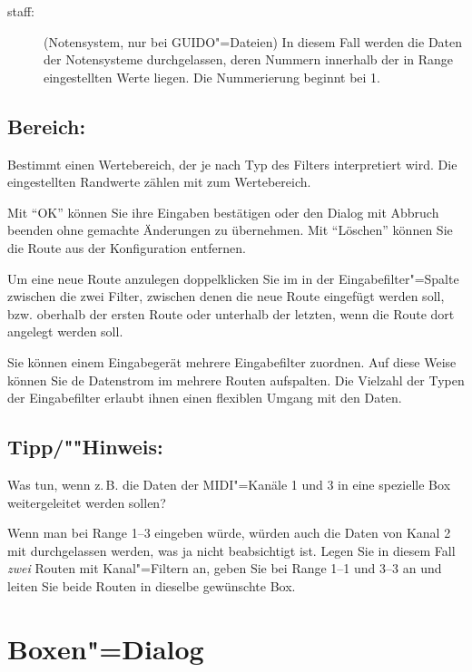 {\begin{description}
\item[staff:] (Notensystem, nur bei GUIDO"=Dateien) In diesem Fall
  werden die Daten der Notensysteme durchgelassen, deren Nummern
  innerhalb der in Range eingestellten Werte liegen. Die Nummerierung
  beginnt bei 1.
\end{description}


\subsection{Bereich:}

Bestimmt einen Wertebereich, der je nach Typ des Filters interpretiert
wird. Die eingestellten Randwerte zählen mit zum Wertebereich.

Mit "`OK"' können Sie ihre Eingaben bestätigen oder den Dialog mit Abbruch
beenden ohne gemachte Änderungen zu übernehmen.  Mit "`Löschen"'
können Sie die Route aus der Konfiguration entfernen.


Um eine neue Route anzulegen doppelklicken Sie im
 in der Eingabefilter"=Spalte
zwischen die zwei Filter, zwischen denen die neue Route eingefügt
werden soll, bzw. oberhalb der ersten Route oder unterhalb der
letzten, wenn die Route dort angelegt werden soll.

Sie können einem Eingabegerät mehrere Eingabefilter zuordnen. 
Auf diese Weise können Sie de Datenstrom im mehrere Routen 
aufspalten. Die Vielzahl der Typen der Eingabefilter erlaubt 
ihnen einen flexiblen Umgang mit den Daten.

\subsection{Tipp/""Hinweis:}
Was tun, wenn z.\,B. die Daten der MIDI"=Kanäle 1 und 3 in eine 
spezielle Box weitergeleitet werden sollen?

Wenn man bei Range 1--3 eingeben würde, würden auch die 
Daten von Kanal 2 mit durchgelassen werden, was ja nicht beabsichtigt 
ist. Legen Sie in diesem Fall \emph{zwei} Routen mit Kanal"=Filtern 
an, geben Sie bei Range 1--1 und 3--3 an und leiten Sie beide 
Routen in dieselbe gewünschte Box. 

\section{Boxen"=Dialog}\label{sec:DE_R2}

}
